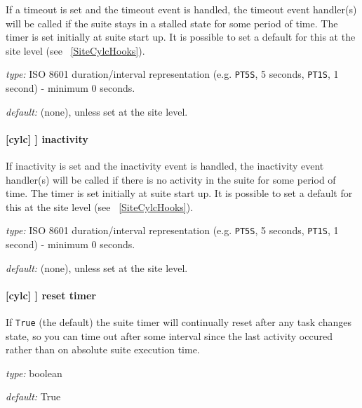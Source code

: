 If a timeout is set and the timeout event is handled, the timeout event
handler(s) will be called if the suite stays in a stalled state for some period
of time. The timer is set initially at suite start up. It is possible to set a
default for this at the site level (see ~\ref{SiteCylcHooks}).

\begin{myitemize}
    \item {\em type:} ISO 8601 duration/interval representation (e.g.
 \lstinline=PT5S=, 5 seconds, \lstinline=PT1S=, 1 second) - minimum 0 seconds.
    \item {\em default:} (none), unless set at the site level.
\end{myitemize}

\paragraph[inactivity]{[cylc] \textrightarrow [[events]] \textrightarrow inactivity}

If inactivity is set and the inactivity event is handled, the inactivity event
handler(s) will be called if there is no activity in the suite for some period
of time. The timer is set initially at suite start up. It is possible to set a
default for this at the site level (see ~\ref{SiteCylcHooks}).

\begin{myitemize}
    \item {\em type:} ISO 8601 duration/interval representation (e.g.
 \lstinline=PT5S=, 5 seconds, \lstinline=PT1S=, 1 second) - minimum 0 seconds.
    \item {\em default:} (none), unless set at the site level.
\end{myitemize}

\paragraph[reset timer]{[cylc] \textrightarrow [[events]] \textrightarrow reset timer}

If \lstinline=True= (the default) the suite timer will continually reset
after any task changes state, so you can time out after some interval
since the last activity occured rather than on absolute suite execution
time.

\begin{myitemize}
    \item {\em type:} boolean
    \item {\em default:} True
\end{myitemize}

